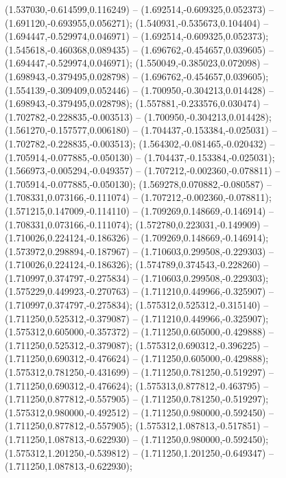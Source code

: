 (1.537030,-0.614599,0.116249) -- (1.692514,-0.609325,0.052373) -- (1.691120,-0.693955,0.056271);
 (1.540931,-0.535673,0.104404) -- (1.694447,-0.529974,0.046971) -- (1.692514,-0.609325,0.052373);
 (1.545618,-0.460368,0.089435) -- (1.696762,-0.454657,0.039605) -- (1.694447,-0.529974,0.046971);
 (1.550049,-0.385023,0.072098) -- (1.698943,-0.379495,0.028798) -- (1.696762,-0.454657,0.039605);
 (1.554139,-0.309409,0.052446) -- (1.700950,-0.304213,0.014428) -- (1.698943,-0.379495,0.028798);
 (1.557881,-0.233576,0.030474) -- (1.702782,-0.228835,-0.003513) -- (1.700950,-0.304213,0.014428);
 (1.561270,-0.157577,0.006180) -- (1.704437,-0.153384,-0.025031) -- (1.702782,-0.228835,-0.003513);
 (1.564302,-0.081465,-0.020432) -- (1.705914,-0.077885,-0.050130) -- (1.704437,-0.153384,-0.025031);
 (1.566973,-0.005294,-0.049357) -- (1.707212,-0.002360,-0.078811) -- (1.705914,-0.077885,-0.050130);
 (1.569278,0.070882,-0.080587) -- (1.708331,0.073166,-0.111074) -- (1.707212,-0.002360,-0.078811);
 (1.571215,0.147009,-0.114110) -- (1.709269,0.148669,-0.146914) -- (1.708331,0.073166,-0.111074);
 (1.572780,0.223031,-0.149909) -- (1.710026,0.224124,-0.186326) -- (1.709269,0.148669,-0.146914);
 (1.573972,0.298894,-0.187967) -- (1.710603,0.299508,-0.229303) -- (1.710026,0.224124,-0.186326);
 (1.574789,0.374543,-0.228260) -- (1.710997,0.374797,-0.275834) -- (1.710603,0.299508,-0.229303);
 (1.575229,0.449923,-0.270763) -- (1.711210,0.449966,-0.325907) -- (1.710997,0.374797,-0.275834);
 (1.575312,0.525312,-0.315140) -- (1.711250,0.525312,-0.379087) -- (1.711210,0.449966,-0.325907);
 (1.575312,0.605000,-0.357372) -- (1.711250,0.605000,-0.429888) -- (1.711250,0.525312,-0.379087);
 (1.575312,0.690312,-0.396225) -- (1.711250,0.690312,-0.476624) -- (1.711250,0.605000,-0.429888);
 (1.575312,0.781250,-0.431699) -- (1.711250,0.781250,-0.519297) -- (1.711250,0.690312,-0.476624);
 (1.575313,0.877812,-0.463795) -- (1.711250,0.877812,-0.557905) -- (1.711250,0.781250,-0.519297);
 (1.575312,0.980000,-0.492512) -- (1.711250,0.980000,-0.592450) -- (1.711250,0.877812,-0.557905);
 (1.575312,1.087813,-0.517851) -- (1.711250,1.087813,-0.622930) -- (1.711250,0.980000,-0.592450);
 (1.575312,1.201250,-0.539812) -- (1.711250,1.201250,-0.649347) -- (1.711250,1.087813,-0.622930);
